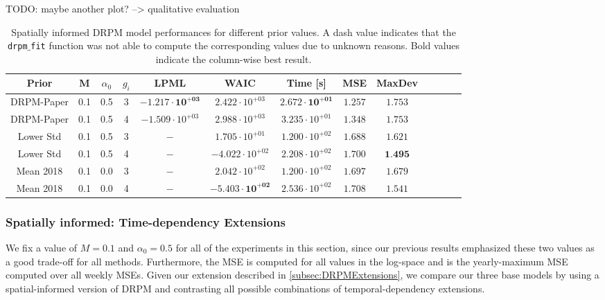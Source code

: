 \documentclass[12pt,a4paper]{article}
\begin{document}
TODO: maybe another plot? --> qualitative evaluation

\begin{table}
    \centering
    \begin{tabular}{ccccccccccccc}
    \toprule
    Prior & M & $\alpha_0$ & $g_i$ & LPML & WAIC & Time [s] & MSE & MaxDev \\
    \midrule
    DRPM-Paper & 0.1 & 0.5 & 3 & $\mathbf{-1.217 \cdot 10^{+03}}$ & $2.422 \cdot 10^{+03}$ & $\mathbf{2.672 \cdot 10^{+01}}$ & $\mathbf{1.257} $ & $1.753$ \\
    DRPM-Paper & 0.1 & 0.5 & 4 & $-1.509 \cdot 10^{+03}$ & $2.988 \cdot 10^{+03}$ & $3.235 \cdot 10^{+01}$ & $1.348 $ & $1.753$ \\
    Lower Std &  0.1 & 0.5 & 3 & $-$ & $1.705 \cdot 10^{+01}$ & $1.200 \cdot 10^{+02}$ & $1.688 $ & $1.621 $ \\
    Lower Std &  0.1 & 0.5 & 4 & $-$ & $-4.022 \cdot 10^{+02}$ & $2.208 \cdot 10^{+02}$ & $1.700 $ & $\textbf{1.495} $ \\
    Mean 2018 &  0.1 & 0.0 & 3 & $-$ & $2.042 \cdot 10^{+02}$ & $1.200 \cdot 10^{+02}$ & $1.697 $ & $1.679 $ \\
    Mean 2018 &  0.1 & 0.0 & 4 & $-$ & $\mathbf{-5.403 \cdot 10^{+02}}$ & $2.536 \cdot 10^{+02}$ & $1.708 $ & $1.541 $ \\
    \bottomrule
    \end{tabular}
\caption{Spatially informed DRPM model performances for different prior values. A dash value indicates that the \texttt{drpm$\_$fit} function
was not able to compute the corresponding values due to unknown reasons. Bold values indicate the column-wise best result.}
\label{tab:DRPMSpatialBaselineSummary}
\end{table}

\subsubsection{Spatially informed: Time-dependency Extensions}
We fix a value of $M= 0.1$ and $\alpha_0 = 0.5$ for all of the experiments in this section, since our previous results emphasized
these two values as a good trade-off for all methods. Furthermore, the MSE is computed for all values in the log-space and is the
yearly-maximum MSE computed over all weekly MSEs. Given our
extension described in \cref{subsec:DRPMExtensions}, we compare our three base models by using a spatial-informed version of
DRPM and contrasting all possible combinations of temporal-dependency extensions.
\end{document}
